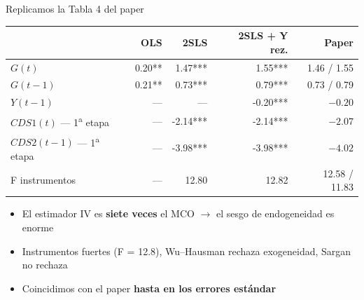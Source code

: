 \documentclass[
  10pt,
  ignorenonframetext,
  aspectratio=169,
  spanish,
]{beamer}
\providecommand{\tightlist}{%
  \setlength{\itemsep}{0pt}\setlength{\parskip}{0pt}}
\begin{document}
\begin{frame}{Replicamos la Tabla 4 del paper}
\protect{}\label{replicamos-la-tabla-4-del-paper}
\begin{table}[!h]
\centering\begingroup\fontsize{8}{10}\selectfont

\begin{tabular}[t]{lrrrr}
\toprule
  & OLS & 2SLS & 2SLS + Y rez. & Paper\\
\midrule
$G(t)$ & 0.20** & 1.47*** & 1.55*** & 1.46 / 1.55\\
$G(t-1)$ & 0.21** & 0.73*** & 0.79*** & 0.73 / 0.79\\
$Y(t-1)$ & --- & --- & -0.20*** & $-0.20$\\
$CDS1(t)$ --- 1\textsuperscript{a} etapa & --- & -2.14*** & -2.14*** & $-2.07$\\
$CDS2(t-1)$ --- 1\textsuperscript{a} etapa & --- & -3.98*** & -3.98*** & $-4.02$\\
F instrumentos & --- & 12.80 & 12.82 & 12.58 / 11.83\\
\bottomrule
\end{tabular}
\endgroup{}
\end{table}

\vspace{0.2cm}

\small

\begin{itemize}
\tightlist
\item
  El estimador IV es \textbf{siete veces} el MCO \(\rightarrow\) el
  sesgo de endogeneidad es enorme
\item
  Instrumentos fuertes (F = 12.8), Wu--Hausman rechaza exogeneidad,
  Sargan no rechaza
\item
  Coincidimos con el paper \textbf{hasta en los errores estándar}
\end{itemize}

\normalsize
\end{frame}
\end{document}
